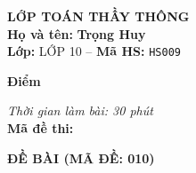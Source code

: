 \noindent
\begin{tcolorbox}[colback=white,colframe=black,arc=0mm,boxrule=0.8pt,top=4pt,bottom=4pt,left=6pt,right=6pt]
	\begin{minipage}[c]{0.44\textwidth}
		{\bfseries\large LỚP TOÁN THẦY THÔNG}\\[3pt]
		\textbf{Họ và tên:} \textbf{\large Trọng Huy}\\[3pt]
		\textbf{Lớp:} LỚP 10 \quad -- \quad \textbf{Mã HS:} \texttt{HS009}
	\end{minipage}
	\hfill
	\begin{minipage}[c]{0.22\textwidth}
		\begin{tcolorbox}[colback=white,colframe=black,arc=0mm,boxrule=0.6pt,height=1.8cm,halign=center,valign=top,top=2pt]
			{\bfseries\normalsize Điểm}
		\end{tcolorbox}
	\end{minipage}
	\hfill
	\begin{minipage}[c]{0.30\textwidth}
		\raggedleft
		\textit{Thời gian làm bài: 30 phút}\\[4pt]
		\textbf{Mã đề thi:} 
	\end{minipage}
\end{tcolorbox}
\vspace{0.25cm}

\noindent\textbf{\large ĐỀ BÀI (MÃ ĐỀ: 010)}
\vspace{0.1cm}

